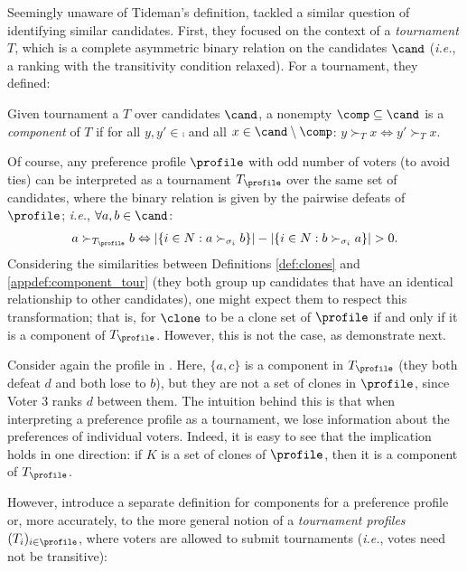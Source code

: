 Seemingly unaware of Tideman's definition, \citet{Laffond96:Composition} tackled a similar question of identifying similar candidates. First, they focused on the context of a \textit{tournament} $T$, which is a complete asymmetric binary relation on the candidates $\cand$ (\emph{i.e.}, a ranking with the transitivity condition relaxed). For a tournament, they defined:
\begin{definition}\label{appdef:component_tour}
Given tournament a $T$ over candidates $\cand$, a nonempty $\comp \subseteq \cand$ is a \emph{component} of $T$ if for all $y,y' \in \comp$ and all $x\in \cand \setminus \comp$: $y\succ_T x \Leftrightarrow y'\succ_{T} x$. 
\end{definition}
Of course, any preference profile $\profile$ with odd number of voters (to avoid ties) can be interpreted as a tournament $T_{\profile}$ over the same set of candidates, where the binary relation is given by the pairwise defeats of $\profile$; \emph{i.e.}, $\forall a,b \in \cand$: 
\begin{align*}
 a \succ_{T_{\profile}} b \Leftrightarrow |\{i \in N: a \succ_{\sigma_i} b\}|-|\{i \in N: b \succ_{\sigma_i} a\}|>0.
\end{align*}
Considering the similarities between Definitions \ref{def:clones} and \ref{appdef:component_tour} (they both group up candidates that have an identical relationship to other candidates), one might expect them to respect this transformation; that is, for $\clone$ to be a clone set of $\profile$ if and only if it is a component of $T_{\profile}$. However, this is not the case, as demonstrate next.

\begin{example} \label{ex:clones_v_components}
    Consider again the profile in . Here, $\{a,c\}$ is a component in $T_{\profile}$ (they both defeat $d$ and both lose to $b$), but they are not a set of clones in $\profile$, since Voter 3 ranks $d$ between them. The intuition behind this is that when interpreting a preference profile as a tournament, we lose information about the preferences of individual voters. Indeed, it is easy to see that the implication holds in one direction: if $K$ is a set of clones of $\profile$, then it is a component of $T_{\profile}$. 
\end{example}

However, \citet{Laffond96:Composition} introduce a separate definition for components for a preference profile or, more accurately, to the more general notion of a \textit{tournament profiles} $(T_i)_{i \in \profile}$, where voters are allowed to submit tournaments (\emph{i.e.}, votes need not be transitive):


